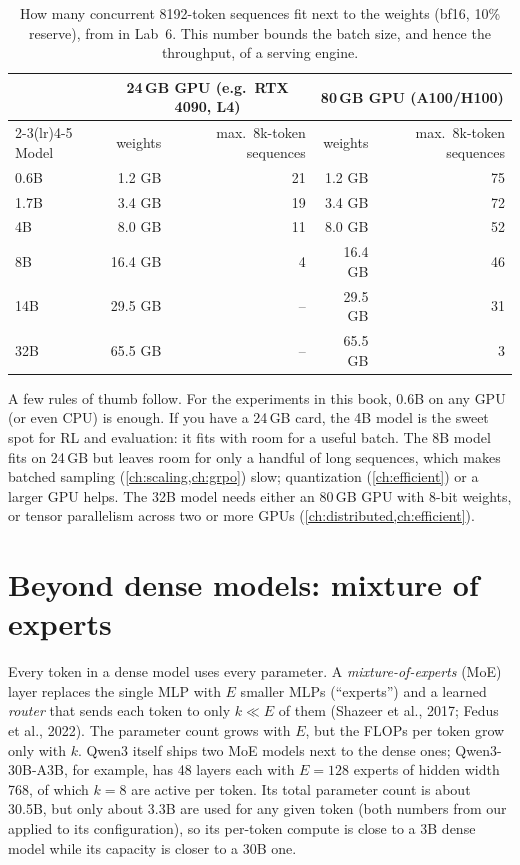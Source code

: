 \begin{table}[h]
\centering\small
\begin{tabular}{lrrrr}
\toprule
& \multicolumn{2}{c}{24\,GB GPU (e.g.\ RTX 4090, L4)} & \multicolumn{2}{c}{80\,GB GPU (A100/H100)}\\
\cmidrule(lr){2-3}\cmidrule(lr){4-5}
Model & weights & max.\ 8k-token sequences & weights & max.\ 8k-token sequences\\
\midrule
0.6B & 1.2 GB & 21 & 1.2 GB & 75\\
1.7B & 3.4 GB & 19 & 3.4 GB & 72\\
4B   & 8.0 GB & 11 & 8.0 GB & 52\\
8B   & 16.4 GB & 4 & 16.4 GB & 46\\
14B  & 29.5 GB & -- & 29.5 GB & 31\\
32B  & 65.5 GB & -- & 65.5 GB & 3\\
\bottomrule
\end{tabular}
\caption{How many concurrent 8192-token sequences fit next to the weights (bf16, 10\% reserve), from
 in Lab~6. This number bounds the batch size, and hence the throughput,
of a serving engine.}
\label{tab:modern:plan}
\end{table}

A few rules of thumb follow. For the experiments in this book, 0.6B on any GPU (or even CPU) is enough.
If you have a 24\,GB card, the 4B model is the sweet spot for RL and evaluation: it fits with room for
a useful batch. The 8B model fits on 24\,GB but leaves room for only a handful of long sequences, which
makes batched sampling (\cref{ch:scaling,ch:grpo}) slow; quantization (\cref{ch:efficient}) or a larger
GPU helps. The 32B model needs either an 80\,GB GPU with 8-bit weights, or tensor parallelism across
two or more GPUs (\cref{ch:distributed,ch:efficient}).

\section{Beyond dense models: mixture of experts}\label{sec:modern:moe}

Every token in a dense model uses every parameter. A \emph{mixture-of-experts} (MoE) layer replaces the
single MLP with $E$ smaller MLPs (``experts'') and a learned \emph{router} that sends each token to only
$k\ll E$ of them (Shazeer et al., 2017; Fedus et al., 2022). The parameter count grows with $E$, but the
FLOPs per token grow only with $k$. Qwen3 itself ships two MoE models next to the dense ones;
Qwen3-30B-A3B, for example, has 48 layers each with $E=128$ experts of hidden width 768, of which $k=8$
are active per token. Its total parameter count is about 30.5B, but only about 3.3B are used for any given
token (both numbers from our  applied to its configuration), so its per-token
compute is close to a 3B dense model while its capacity is closer to a 30B one.

